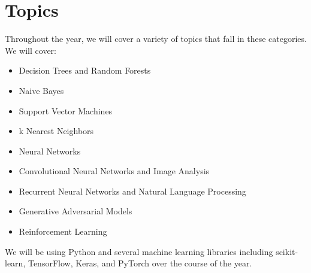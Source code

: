 \documentclass{article}
\begin{document}
\section{Topics}
Throughout the year, we will cover a variety of topics that fall in these categories. \newline
We will cover: 
\begin{itemize}
\item Decision Trees and Random Forests
\item Naive Bayes
\item Support Vector Machines
\item k Nearest Neighbors
\item Neural Networks
\item Convolutional Neural Networks and Image Analysis
\item Recurrent Neural Networks and Natural Language Processing 
\item Generative Adversarial Models 
\item Reinforcement Learning 
\end{itemize}
We will be using Python and several machine learning libraries including scikit-learn, TensorFlow, Keras, and PyTorch over the course of the year.
\end{document}
